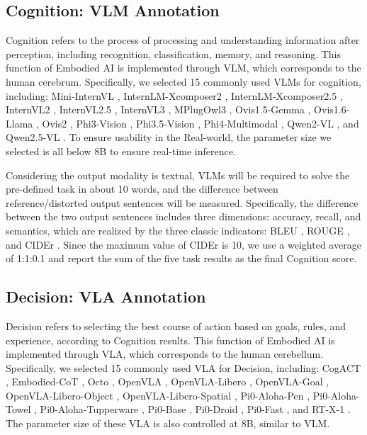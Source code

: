 \documentclass{article}
\begin{document}
\subsection{Cognition: VLM Annotation}
\label{sec:vlm}

Cognition refers to the process of processing and understanding information after perception, including recognition, classification, memory, and reasoning. This function of Embodied AI is implemented through VLM, which corresponds to the human cerebrum. Specifically, we selected 15 commonly used VLMs for cognition, including: Mini-InternVL \cite{vlm:mini_internvl}, InternLM-Xcomposer2 \cite{vlm:internlm-xcomposer2}, InternLM-Xcomposer2.5 \cite{vlm:internlm-xcomposer2d5}, InternVL2 \cite{vlm:internvl2}, InternVL2.5 \cite{vlm:internvl2.5}, InternVL3 \cite{vlm:internvl3}, MPlugOwl3 \cite{vlm:mplug_owl}, Ovis1.5-Gemma \cite{vlm:ovis-gemma}, Ovis1.6-Llama \cite{vlm:ovis-llama}, Ovis2 \cite{vlm:ovis2}, Phi3-Vision \cite{vlm:phi3}, Phi3.5-Vision \cite{vlm:phi3.5}, Phi4-Multimodal \cite{vlm:phi4}, Qwen2-VL \cite{vlm:qwen2}, and Qwen2.5-VL \cite{vlm:qwen2.5}. To ensure usability in the Real-world, the parameter size we selected is all below 8B to ensure real-time inference.

Considering the output modality is textual, VLMs will be required to solve the pre-defined task in about 10 words, and the difference between reference/distorted output sentences will be measured. Specifically, the difference between the two output sentences includes three dimensions: accuracy, recall, and semantics, which are realized by the three classic indicators: BLEU \cite{eval:bleu}, ROUGE \cite{eval:cider}, and CIDEr \cite{eval:cider}. Since the maximum value of CIDEr is 10, we use a weighted average of 1:1:0.1 and report the sum of the five task results as the final Cognition score.

\subsection{Decision: VLA Annotation}
\label{sec:vla}

Decision refers to selecting the best course of action based on goals, rules, and experience, according to Cognition results. This function of Embodied AI is implemented through VLA, which corresponds to the human cerebellum. Specifically, we selected 15 commonly used VLA for Decision, including: CogACT \cite{vla:cogact}, Embodied-CoT \cite{vla:embodied-cot}, Octo \cite{vla:octo}, OpenVLA \cite{vla:openvla_v1}, OpenVLA-Libero \cite{vla:openvla_v3}, OpenVLA-Goal \cite{vla:openvla_v2}, OpenVLA-Libero-Object \cite{vla:openvla_v2}, OpenVLA-Libero-Spatial \cite{vla:openvla_v2}, Pi0-Aloha-Pen \cite{vla:pi0_v3}, Pi0-Aloha-Towel \cite{vla:pi0_v3}, Pi0-Aloha-Tupperware \cite{vla:pi0_v3}, Pi0-Base \cite{vla:pi0_v1}, Pi0-Droid \cite{vla:pi0_fast}, Pi0-Fast \cite{vla:pi0_fast}, and RT-X-1 \cite{vla:rt_x}. The parameter size of these VLA is also controlled at 8B, similar to VLM. 
\end{document}
